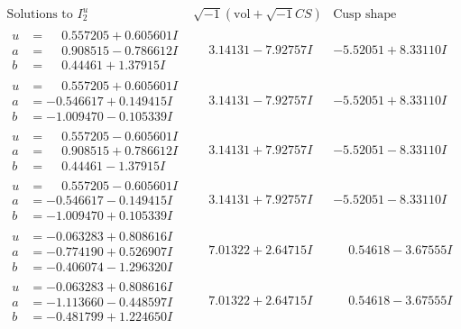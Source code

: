 \documentclass[1p]{elsarticle_modified}
\theoremstyle{definition}
\newcommand{\I}{\sqrt{-1}}
\begin{document}
$$\begin{array}{c|c|c}  
\text{Solutions to }I^u_{2}& \I (\text{vol} + \sqrt{-1}CS) & \text{Cusp shape}\\
 \hline 
\begin{aligned}
u &= \phantom{-}0.557205 + 0.605601 I \\
a &= \phantom{-}0.908515 - 0.786612 I \\
b &= \phantom{-}0.44461 + 1.37915 I\end{aligned}
 & \phantom{-}3.14131 - 7.92757 I & -5.52051 + 8.33110 I \\ \hline\begin{aligned}
u &= \phantom{-}0.557205 + 0.605601 I \\
a &= -0.546617 + 0.149415 I \\
b &= -1.009470 - 0.105339 I\end{aligned}
 & \phantom{-}3.14131 - 7.92757 I & -5.52051 + 8.33110 I \\ \hline\begin{aligned}
u &= \phantom{-}0.557205 - 0.605601 I \\
a &= \phantom{-}0.908515 + 0.786612 I \\
b &= \phantom{-}0.44461 - 1.37915 I\end{aligned}
 & \phantom{-}3.14131 + 7.92757 I & -5.52051 - 8.33110 I \\ \hline\begin{aligned}
u &= \phantom{-}0.557205 - 0.605601 I \\
a &= -0.546617 - 0.149415 I \\
b &= -1.009470 + 0.105339 I\end{aligned}
 & \phantom{-}3.14131 + 7.92757 I & -5.52051 - 8.33110 I \\ \hline\begin{aligned}
u &= -0.063283 + 0.808616 I \\
a &= -0.774190 + 0.526907 I \\
b &= -0.406074 - 1.296320 I\end{aligned}
 & \phantom{-}7.01322 + 2.64715 I & \phantom{-}0.54618 - 3.67555 I \\ \hline\begin{aligned}
u &= -0.063283 + 0.808616 I \\
a &= -1.113660 - 0.448597 I \\
b &= -0.481799 + 1.224650 I\end{aligned}
 & \phantom{-}7.01322 + 2.64715 I & \phantom{-}0.54618 - 3.67555 I \\ \hline\begin{aligned}

\end{aligned}
\end{array}$$
\end{document}
